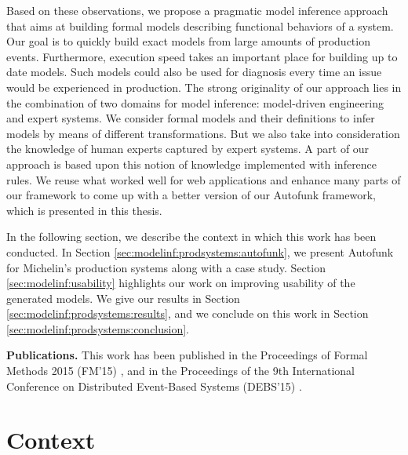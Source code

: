 Based on these observations, we propose a pragmatic model
inference approach that aims at building formal models describing
functional behaviors of a system. Our goal is to quickly build
exact models from large amounts of production events.
Furthermore, execution
speed takes an important place for building up to date models.
Such models could also be used for diagnosis every time an issue
would be experienced in production. The strong originality of our
approach lies in the combination of two domains for model
inference: model-driven engineering and expert systems. We
consider formal models and their definitions to infer models by
means of different transformations. But we also take into
consideration the knowledge of human experts captured by expert
systems. A part of our approach is based upon this notion of
knowledge implemented with inference rules. We reuse what worked
well for web applications and enhance many parts of our framework
to come up with a better version of our Autofunk framework, which
is presented in this thesis.

In the following section, we describe the context in which this
work has been conducted. In Section
\ref{sec:modelinf:prodsystems:autofunk}, we present Autofunk for
Michelin's production systems along with a case study. Section
\ref{sec:modelinf:usability} highlights our work on improving
usability of the generated models.  We give our results in
Section \ref{sec:modelinf:prodsystems:results}, and we conclude
on this work in Section \ref{sec:modelinf:prodsystems:conclusion}.

\textbf{Publications.} This work has been published in the
Proceedings of Formal Methods 2015 (FM'15)
\cite{DBLP:conf/fm/DurandS15}, and in the Proceedings of the 9th
International Conference on Distributed Event-Based Systems
(DEBS'15) \cite{DBLP:conf/debs/SalvaD15}.

\section{Context}
\label{prodsys:context}

